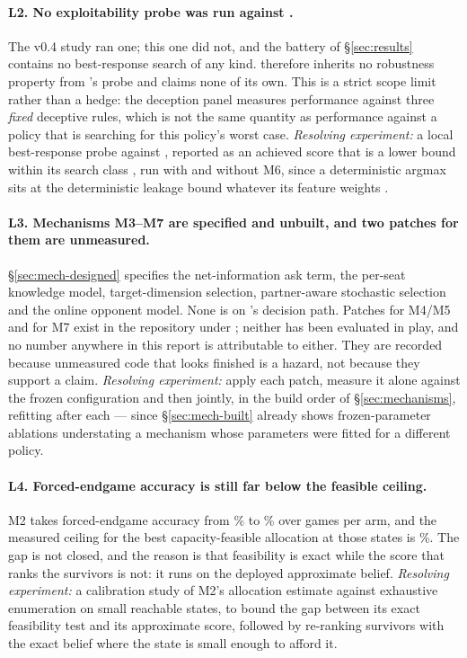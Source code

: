 \paragraph{L2. No exploitability probe was run against \vfive{}.} The v0.4 study
ran one; this one did not, and the battery of \S\ref{sec:results} contains no
best-response search of any kind. \vfive{} therefore inherits no robustness
property from \vfour{}'s probe and claims none of its own. This is a strict
scope limit rather than a hedge: the deception panel measures performance against
three \emph{fixed} deceptive rules, which is not the same quantity as
performance against a policy that is searching for this policy's worst case.
\emph{Resolving experiment:} a local best-response probe against \vfive{},
reported as an achieved score that is a lower bound within its search class
\cite{lisy-lbr}, run with and without M6, since a deterministic argmax sits at
the deterministic leakage bound whatever its feature weights
\cite{alvim-leakage}.

\paragraph{L3. Mechanisms M3--M7 are specified and unbuilt, and two patches for
them are unmeasured.} \S\ref{sec:mech-designed} specifies the net-information ask
term, the per-seat knowledge model, target-dimension selection, partner-aware
stochastic selection and the online opponent model. None is on \vfive{}'s
decision path. Patches for M4/M5 and for M7 exist in the repository
under ; neither has been evaluated in play, and
no number anywhere in this report is attributable to either. They are recorded
because unmeasured code that looks finished is a hazard, not because they support
a claim. \emph{Resolving experiment:} apply each patch, measure it alone against
the frozen configuration and then jointly, in the build order of
\S\ref{sec:mechanisms}, refitting after each --- since
\S\ref{sec:mech-built} already shows frozen-parameter ablations understating a
mechanism whose parameters were fitted for a different policy.

\paragraph{L4. Forced-endgame accuracy is still far below the feasible
ceiling.} M2 takes forced-endgame accuracy from \numVfourForcedAcc\% to
\numVfiveForcedAcc\% over \numForcedEightGames{} games per arm, and the measured
ceiling for the best capacity-feasible allocation at those states is
\numFeasibleRight\%. The gap is not closed, and the reason is that feasibility
is exact while the score that ranks the survivors is not: it runs on the
deployed approximate belief. \emph{Resolving experiment:} a calibration study of
M2's allocation estimate against exhaustive enumeration on small reachable
states, to bound the gap between its exact feasibility test and its approximate
score, followed by re-ranking survivors with the exact belief where the state is
small enough to afford it.

